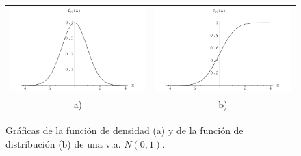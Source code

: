 \begin{figure}[h]
\begin{center}
\begin{tabular}{cc}
 \includegraphics[scale=0.75]{densidadgaussiana}
&
\includegraphics[scale=0.75]{distribuciongaussiana}\\ a) & b) \end{tabular}
\end{center}
       \caption{Gráficas de la función de densidad (a)  y de la  función de distribución (b) de una v.a. $N(0,1)$.}
        \end{figure}






